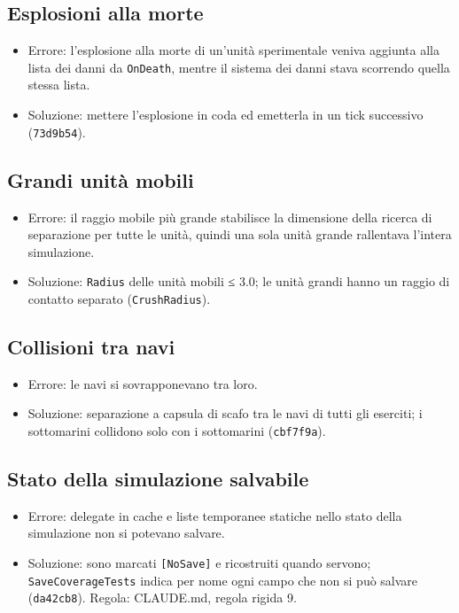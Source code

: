 \documentclass[11pt]{article}
\begin{document}
\subsection{Esplosioni alla morte}
\label{sec:orgcdb08df}
\begin{itemize}
\item Errore: l'esplosione alla morte di un'unità sperimentale veniva aggiunta alla lista dei danni da \texttt{OnDeath}, mentre
il sistema dei danni stava scorrendo quella stessa lista.
\item Soluzione: mettere l'esplosione in coda ed emetterla in un tick successivo (\texttt{73d9b54}).
\end{itemize}
\subsection{Grandi unità mobili}
\label{sec:org1fad928}
\begin{itemize}
\item Errore: il raggio mobile più grande stabilisce la dimensione della ricerca di separazione per tutte le unità,
quindi una sola unità grande rallentava l'intera simulazione.
\item Soluzione: \texttt{Radius} delle unità mobili ≤ 3.0; le unità grandi hanno un raggio di contatto separato
(\texttt{CrushRadius}).
\end{itemize}
\subsection{Collisioni tra navi}
\label{sec:org891c4f9}
\begin{itemize}
\item Errore: le navi si sovrapponevano tra loro.
\item Soluzione: separazione a capsula di scafo tra le navi di tutti gli eserciti; i sottomarini collidono solo con i
sottomarini (\texttt{cbf7f9a}).
\end{itemize}
\subsection{Stato della simulazione salvabile}
\label{sec:org5f492bd}
\begin{itemize}
\item Errore: delegate in cache e liste temporanee statiche nello stato della simulazione non si potevano salvare.
\item Soluzione: sono marcati \texttt{[NoSave]} e ricostruiti quando servono; \texttt{SaveCoverageTests} indica per nome ogni campo
che non si può salvare (\texttt{da42cb8}). Regola: CLAUDE.md, regola rigida 9.
\end{itemize}
\end{document}
